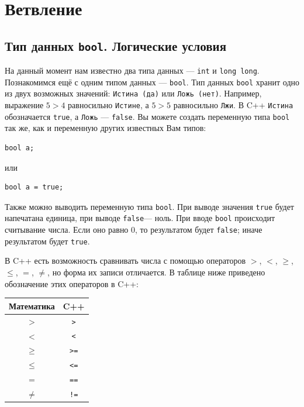 \documentclass{article}
\newcommand{\tabularII}[1]{\begin{center}\begin{tabular}{|c|c|} #1 \end{tabular}\end{center}}
\begin{document}
	\section{Ветвление}
	
	\subsection{Тип данных \texttt{bool}. Логические условия}
	
	На данный момент нам известно два типа данных --- \texttt{int} и \texttt{long long}. Познакомимся ещё с одним типом данных --- \texttt{bool}. Тип данных \texttt{bool} хранит одно из двух возможных значений: \texttt{Истина (да)} или \texttt{Ложь (нет)}. Например, выражение $5>4$ равносильно \texttt{Истине}, а $5>5$ равносильно \texttt{Лжи}. В C++ \texttt{Истина} обозначается \texttt{true}, а \texttt{Ложь} --- \texttt{false}. Вы можете создать переменную типа \texttt{bool} так же, как и переменную других известных Вам типов:
	
	\begin{lstlisting}
bool a;
	\end{lstlisting}
	
	или
	
	\begin{lstlisting}
bool a = true;
	\end{lstlisting}
	
	Также можно выводить переменную типа \texttt{bool}. При выводе значения \texttt{true} будет напечатана единица, при выводе \texttt{false}\;--- ноль. При вводе \texttt{bool} происходит считывание числа. Если оно равно $0$, то результатом будет \texttt{false}; иначе результатом будет \texttt{true}.
	
	В C++ есть возможность сравнивать числа с помощью операторов $>$, $<$, $\ge$, $\le$, $=$, $\ne$, но форма их записи отличается. В таблице ниже приведено обозначение этих операторов в C++:
	
	\tabularII{
		\hline
		\textbf{Математика} & \textbf{C++}\\
		\hline
		$>$ & \texttt{>}\\
		\hline
		$<$ & \texttt{<}\\
		\hline
		$\ge$ & \texttt{>=}\\
		\hline
		$\le$ & \texttt{<=}\\
		\hline
		$=$ & \texttt{==}\\
		\hline
		$\ne$ & \texttt{!=}\\
		\hline
	}
	
\end{document}
